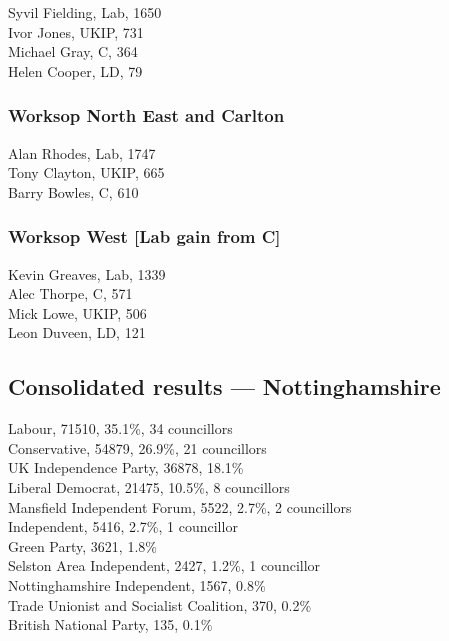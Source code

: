 \documentclass[a4paper,openany,10pt]{book}
\begin{document}


Syvil Fielding, Lab, 1650\\
Ivor Jones, UKIP, 731\\
Michael Gray, C, 364\\
Helen Cooper, LD, 79\\


\subsubsection*{Worksop North East and Carlton}



Alan Rhodes, Lab, 1747\\
Tony Clayton, UKIP, 665\\
Barry Bowles, C, 610\\


\subsubsection*{Worksop West \hspace*{\fill}\nolinebreak[1]%
\enspace\hspace*{\fill}
[Lab gain from C]}



Kevin Greaves, Lab, 1339\\
Alec Thorpe, C, 571\\
Mick Lowe, UKIP, 506\\
Leon Duveen, LD, 121\\




\subsection*{Consolidated results --- Nottinghamshire}
Labour, 71510, 35.1\%, 34 councillors\\
Conservative, 54879, 26.9\%, 21 councillors\\
UK Independence Party, 36878, 18.1\% \\
Liberal Democrat, 21475, 10.5\%, 8 councillors\\
Mansfield Independent Forum, 5522, 2.7\%, 2 councillors\\
Independent, 5416, 2.7\%, 1 councillor\\
Green Party, 3621, 1.8\% \\
Selston Area Independent, 2427, 1.2\%, 1 councillor\\
Nottinghamshire Independent, 1567, 0.8\% \\
Trade Unionist and Socialist Coalition, 370, 0.2\% \\
British National Party, 135, 0.1\% \\
\end{document}
